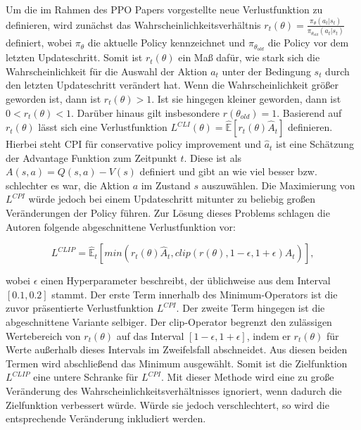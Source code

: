 Um die im Rahmen des \ac{PPO} Papers vorgestellte neue Verlustfunktion zu definieren, wird zunächst das Wahrscheinlichkeitsverhältnis $r_t(\theta) = \frac{\pi_\theta(a_t|s_t)}{\pi_{\theta_{old}}(a_t|s_t)}$ definiert, wobei $\pi_\theta$ die aktuelle Policy kennzeichnet und $\pi_{\theta_{old}}$ die Policy vor dem letzten Updateschritt. Somit ist $r_t(\theta)$ ein Maß dafür, wie stark sich die Wahrscheinlichkeit für die Auswahl der Aktion $a_t$ unter der Bedingung $s_t$ durch den letzten Updateschritt verändert hat. Wenn die Wahrscheinlichkeit größer geworden ist, dann ist $r_t(\theta) > 1$. Ist sie hingegen kleiner geworden, dann ist $0 < r_t(\theta) < 1$. Darüber hinaus gilt insbesondere $r(\theta_{old}) = 1$. Basierend auf $r_t(\theta)$ lässt sich eine Verlustfunktion $L^{CLI}(\theta) = \hat{\mathbb{E}}[r_t(\theta) \hat{A}_t]$ definieren. Hierbei steht CPI für conservative policy improvement und $\hat{a}_t$ ist eine Schätzung der Advantage Funktion zum Zeitpunkt $t$. Diese ist als $A(s,a) = Q(s,a) - V(s)$ definiert und gibt an wie viel besser bzw. schlechter es war, die Aktion $a$ im Zustand $s$ auszuwählen. Die Maximierung von $L^{CPI}$ würde jedoch bei einem Updateschritt mitunter zu beliebig großen Veränderungen der Policy führen. Zur Lösung dieses Problems schlagen die Autoren folgende abgeschnittene Verlustfunktion vor:

\begin{equation}
  \label{L_CLIP}
	L^{CLIP} = \hat{\mathbb{E}}_t[min(r_t(\theta) \hat{A}_t, clip(r(\theta), 1-\epsilon, 1+\epsilon) \hat{A}_t)],
\end{equation}

wobei $\epsilon$ einen Hyperparameter beschreibt, der üblichweise aus dem Interval $[0.1, 0.2]$ stammt. Der erste Term innerhalb des Minimum-Operators ist die zuvor präsentierte Verlustfunktion $L^{CPI}$. Der zweite Term hingegen ist die abgeschnittene Variante selbiger. Der clip-Operator begrenzt den zulässigen Wertebereich von $r_t(\theta)$ auf das Interval $[1-\epsilon, 1+\epsilon]$, indem er $r_t(\theta)$ für Werte außerhalb dieses Intervals im Zweifelsfall abschneidet. Aus diesen beiden Termen wird abschließend das Minimum ausgewählt. Somit ist die Zielfunktion $L^{CLIP}$ eine untere Schranke für $L^{CPI}$. Mit dieser Methode wird eine zu große Veränderung des Wahrscheinlichkeitsverhältnisses ignoriert, wenn dadurch die Zielfunktion verbessert würde. Würde sie jedoch verschlechtert, so wird die entsprechende Veränderung inkludiert werden.

